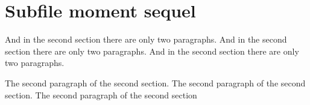 \documentclass[../main.tex]{subfiles}%
\begin{document}
%
\normalsize%
\section{Subfile moment sequel}%
\label{sec:Subfilemomentsequel}%
And in the second section there are only two paragraphs. And in the second section there are only two paragraphs. And in the second section there are only two paragraphs. %
\par%
The second paragraph of the second section. The second paragraph of the second section. The second paragraph of the second section%
\par

%
\end{document}
